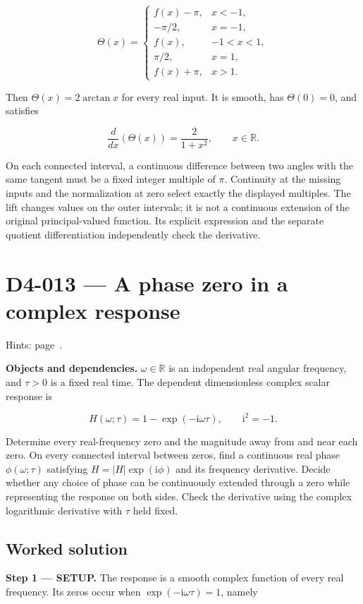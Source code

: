 \documentclass[11pt,oneside,openany]{book}
\begin{document}
\[
\Theta(x)=
\begin{cases}
f(x)-\pi,&x<-1,\\
-\pi/2,&x=-1,\\
f(x),&-1<x<1,\\
\pi/2,&x=1,\\
f(x)+\pi,&x>1.
\end{cases}
\]

Then \(\Theta(x)=2\arctan x\) for every real input. It is smooth, has \(\Theta(0)=0\), and satisfies

\[
\frac{d}{dx}\left(\Theta(x)\right)=\frac{2}{1+x^2},\qquad x\in\mathbb R.
\]

On each connected interval, a continuous difference between two angles with the same tangent must be a fixed integer multiple of \(\pi\). Continuity at the missing inputs and the normalization at zero select exactly the displayed multiples. The lift changes values on the outer intervals; it is not a continuous extension of the original principal-valued function. Its explicit expression and the separate quotient differentiation independently check the derivative.
\endgroup
\clearpage
\section{D4-013 --- A phase zero in a complex response}
\label{problem:D4-013}
{\small Hints: page~\pageref{hints:D4-013}.}\par\medskip

\textbf{Objects and dependencies.} \(\omega\in\mathbb R\) is an independent real angular frequency, and \(\tau>0\) is a fixed real time. The dependent dimensionless complex scalar response is

\[
H(\omega;\tau)=1-\exp(-\mathrm i\omega\tau),\qquad \mathrm i^2=-1.
\]

Determine every real-frequency zero and the magnitude away from and near each zero. On every connected interval between zeros, find a continuous real phase \(\phi(\omega;\tau)\) satisfying \(H=|H|\exp(\mathrm i\phi)\) and its frequency derivative. Decide whether any choice of phase can be continuously extended through a zero while representing the response on both sides. Check the derivative using the complex logarithmic derivative with \(\tau\) held fixed.
\subsection*{Worked solution}

\textbf{Step 1 --- SETUP.} The response is a smooth complex function of every real frequency. Its zeros occur when \(\exp(-\mathrm i\omega\tau)=1\), namely
\end{document}
